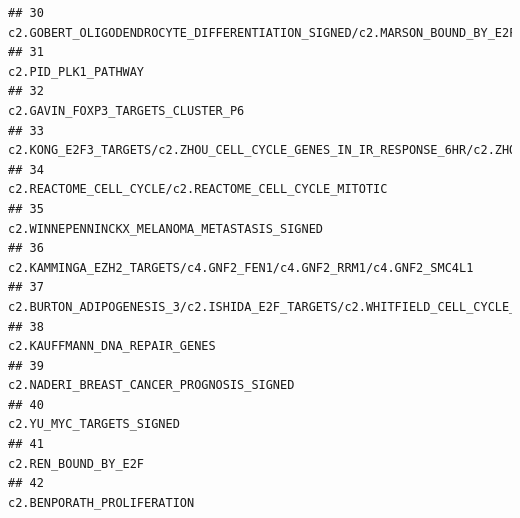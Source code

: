 \documentclass{article}\usepackage[]{graphicx}\usepackage[]{color}
\makeatletter
\newenvironment{kframe}{%
 \def\at@end@of@kframe{}%
 \ifinner\ifhmode%
  \def\at@end@of@kframe{\end{minipage}}%
  \begin{minipage}{\columnwidth}%
 \fi\fi%
 \def\FrameCommand##1{\hskip\@totalleftmargin \hskip-\fboxsep
 \colorbox{shadecolor}{##1}\hskip-\fboxsep
     \hskip-\linewidth \hskip-\@totalleftmargin \hskip\columnwidth}%
 \MakeFramed {\advance\hsize-\width
   \@totalleftmargin\z@ \linewidth\hsize
   \@setminipage}}%
 {\par\unskip\endMakeFramed%
 \at@end@of@kframe}
\newenvironment{knitrout}{}{} %
\makeatother
\begin{document}
\begin{knitrout}
\begin{kframe}
\begin{verbatim}
## 30                                                                                                                             c2.GOBERT_OLIGODENDROCYTE_DIFFERENTIATION_SIGNED/c2.MARSON_BOUND_BY_E2F4_UNSTIMULATED
## 31                                                                                                                                                                                               c2.PID_PLK1_PATHWAY
## 32                                                                                                                                                                                 c2.GAVIN_FOXP3_TARGETS_CLUSTER_P6
## 33                                                                                                     c2.KONG_E2F3_TARGETS/c2.ZHOU_CELL_CYCLE_GENES_IN_IR_RESPONSE_6HR/c2.ZHOU_CELL_CYCLE_GENES_IN_IR_RESPONSE_24HR
## 34                                                                                                                                                             c2.REACTOME_CELL_CYCLE/c2.REACTOME_CELL_CYCLE_MITOTIC
## 35                                                                                                                                                                      c2.WINNEPENNINCKX_MELANOMA_METASTASIS_SIGNED
## 36                                                                                                                                                 c2.KAMMINGA_EZH2_TARGETS/c4.GNF2_FEN1/c4.GNF2_RRM1/c4.GNF2_SMC4L1
## 37                                                                                                                                 c2.BURTON_ADIPOGENESIS_3/c2.ISHIDA_E2F_TARGETS/c2.WHITFIELD_CELL_CYCLE_LITERATURE
## 38                                                                                                                                                                                     c2.KAUFFMANN_DNA_REPAIR_GENES
## 39                                                                                                                                                                          c2.NADERI_BREAST_CANCER_PROGNOSIS_SIGNED
## 40                                                                                                                                                                                          c2.YU_MYC_TARGETS_SIGNED
## 41                                                                                                                                                                                               c2.REN_BOUND_BY_E2F
## 42                                                                                                                                                                                        c2.BENPORATH_PROLIFERATION

\end{verbatim}
\end{kframe}
\end{knitrout}
\end{document}
